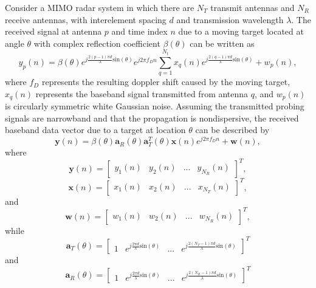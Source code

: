 \documentclass[journal,draftcls,onecolumn,twoside]{IEEEtran}
\begin{document}
Consider a MIMO radar system in which there are $N_{T}$ transmit antennas and $N_{R}$ receive antennas, with interelement spacing $d$ and transmission wavelength $\lambda$. The received signal at antenna $p$ and time index $n$ due to a moving target located at angle $\theta$ with complex reflection coefficient $\beta(\theta)$ can be written as
\begin{equation}
y_{p}(n) = \beta(\theta)e^{j \frac{2(p-1)\pi d}{\lambda} \mathrm{sin}(\theta)}e^{j2\pi f_{D}n} \sum_{q = 1}^{N_{t}}x_{q}(n)e^{j \frac{2(q-1)\pi d}{\lambda} \mathrm{sin}(\theta)} + w_{p}(n),
\end{equation}
where $f_{D}$ represents the resulting doppler shift caused by the moving target, $x_{q}(n)$ represents the baseband signal transmitted from antenna $q$, and $w_{p}(n)$ is circularly symmetric white Gaussian noise. Assuming the transmitted probing signals are narrowband and that the propagation is nondispersive, the received baseband data vector due to a target at location $\theta$ can be described by
\begin{equation}
\mathbf{y}(n) = \beta(\theta)\mathbf{a}_{R}(\theta)\mathbf{a}_{T}^{T}(\theta)\mathbf{x}(n)e^{j2\pi f_{D}n} + \mathbf{w}(n),
\end{equation}
where
\begin{equation}
\mathbf{y}(n) = \begin{bmatrix}y_{1}(n) & y_{2}(n) & ... & y_{N_{R}}(n)\end{bmatrix}^T,
\end{equation}
\begin{equation}
\mathbf{x}(n) = \begin{bmatrix}x_{1}(n) & x_{2}(n) & ... & x_{N_{T}}(n)\end{bmatrix}^T,
\end{equation}
and
\begin{equation}
\mathbf{w}(n) = \begin{bmatrix}w_{1}(n) & w_{2}(n) & ... & w_{N_{R}}(n)\end{bmatrix}^T,
\end{equation}
while
\begin{equation}
\mathbf{a}_{T}(\theta) = \begin{bmatrix}
1 & e^{j \frac{2\pi d}{\lambda} \mathrm{sin}(\theta)} & ... & e^{j \frac{2(N_{T}-1)\pi d}{\lambda} \mathrm{sin}(\theta)}
\end{bmatrix}^{T}
\end{equation}
and
\begin{equation}
\mathbf{a}_{R}(\theta) = \begin{bmatrix}
1 & e^{j \frac{2\pi d}{\lambda} \mathrm{sin}(\theta)} & ... & e^{j \frac{2(N_{R}-1)\pi d}{\lambda} \mathrm{sin}(\theta)}
\end{bmatrix}^{T}
\end{equation}
\end{document}
